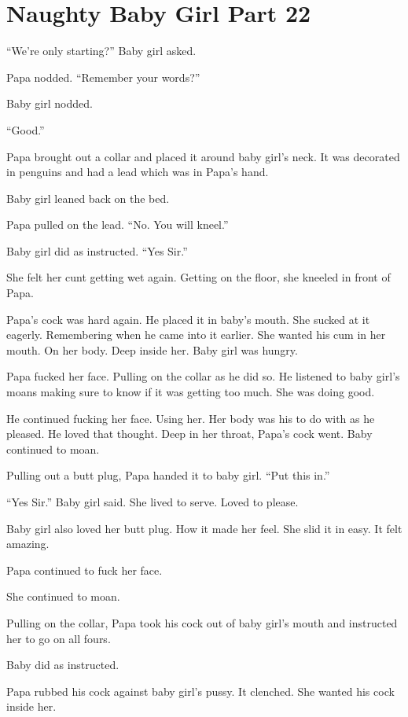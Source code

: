 \section{Naughty Baby Girl Part 22}

     “We’re only starting?” Baby girl asked.

     Papa nodded. “Remember your words?”

     Baby girl nodded.

     “Good.”

     Papa brought out a collar and placed it around baby girl’s neck. It was decorated in penguins and had a lead which was in Papa’s hand.

     Baby girl leaned back on the bed.

     Papa pulled on the lead. “No. You will kneel.”

     Baby girl did as instructed. “Yes Sir.”

     She felt her cunt getting wet again. Getting on the floor, she kneeled in front of Papa.

     Papa’s cock was hard again. He placed it in baby’s mouth. She sucked at it eagerly. Remembering when he came into it earlier. She wanted his cum in her mouth. On her body. Deep inside her. Baby girl was hungry.

     Papa fucked her face. Pulling on the collar as he did so. He listened to baby girl’s moans making sure to know if it was getting too much. She was doing good.

     He continued fucking her face. Using her. Her body was his to do with as he pleased. He loved that thought. Deep in her throat, Papa’s cock went. Baby continued to moan.

     Pulling out a butt plug, Papa handed it to baby girl. “Put this in.”

     “Yes Sir.” Baby girl said. She lived to serve. Loved to please.

     Baby girl also loved her butt plug. How it made her feel. She slid it in easy. It felt amazing.

     Papa continued to fuck her face.

     She continued to moan.

     Pulling on the collar, Papa took his cock out of baby girl’s mouth and instructed her to go on all fours.

     Baby did as instructed.

     Papa rubbed his cock against baby girl’s pussy. It clenched. She wanted his cock inside her.

